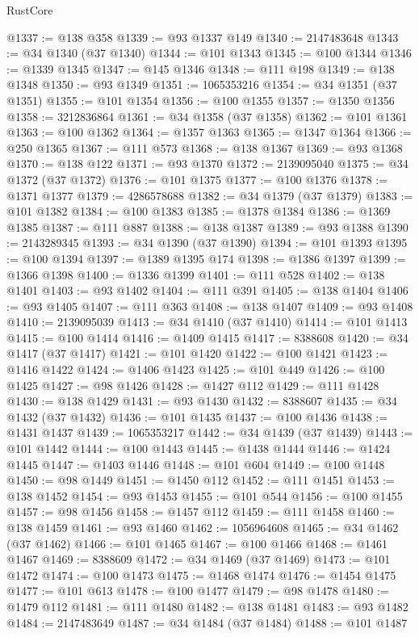\begin{lexlean}{RustCore}
\begin{coremodule}
@1337 := @138 @358
@1339 := @93 @1337 @149
@1340 := 2147483648
@1343 := @34 @1340 (@37 @1340)
@1344 := @101 @1343
@1345 := @100 @1344
@1346 := @1339 @1345
@1347 := @145 @1346
@1348 := @111 @198
@1349 := @138 @1348
@1350 := @93 @1349
@1351 := 1065353216
@1354 := @34 @1351 (@37 @1351)
@1355 := @101 @1354
@1356 := @100 @1355
@1357 := @1350 @1356
@1358 := 3212836864
@1361 := @34 @1358 (@37 @1358)
@1362 := @101 @1361
@1363 := @100 @1362
@1364 := @1357 @1363
@1365 := @1347 @1364
@1366 := @250 @1365
@1367 := @111 @573
@1368 := @138 @1367
@1369 := @93 @1368
@1370 := @138 @122
@1371 := @93 @1370
@1372 := 2139095040
@1375 := @34 @1372 (@37 @1372)
@1376 := @101 @1375
@1377 := @100 @1376
@1378 := @1371 @1377
@1379 := 4286578688
@1382 := @34 @1379 (@37 @1379)
@1383 := @101 @1382
@1384 := @100 @1383
@1385 := @1378 @1384
@1386 := @1369 @1385
@1387 := @111 @887
@1388 := @138 @1387
@1389 := @93 @1388
@1390 := 2143289345
@1393 := @34 @1390 (@37 @1390)
@1394 := @101 @1393
@1395 := @100 @1394
@1397 := @1389 @1395 @174
@1398 := @1386 @1397
@1399 := @1366 @1398
@1400 := @1336 @1399
@1401 := @111 @528
@1402 := @138 @1401
@1403 := @93 @1402
@1404 := @111 @391
@1405 := @138 @1404
@1406 := @93 @1405
@1407 := @111 @363
@1408 := @138 @1407
@1409 := @93 @1408
@1410 := 2139095039
@1413 := @34 @1410 (@37 @1410)
@1414 := @101 @1413
@1415 := @100 @1414
@1416 := @1409 @1415
@1417 := 8388608
@1420 := @34 @1417 (@37 @1417)
@1421 := @101 @1420
@1422 := @100 @1421
@1423 := @1416 @1422
@1424 := @1406 @1423
@1425 := @101 @449
@1426 := @100 @1425
@1427 := @98 @1426
@1428 := @1427 @112
@1429 := @111 @1428
@1430 := @138 @1429
@1431 := @93 @1430
@1432 := 8388607
@1435 := @34 @1432 (@37 @1432)
@1436 := @101 @1435
@1437 := @100 @1436
@1438 := @1431 @1437
@1439 := 1065353217
@1442 := @34 @1439 (@37 @1439)
@1443 := @101 @1442
@1444 := @100 @1443
@1445 := @1438 @1444
@1446 := @1424 @1445
@1447 := @1403 @1446
@1448 := @101 @604
@1449 := @100 @1448
@1450 := @98 @1449
@1451 := @1450 @112
@1452 := @111 @1451
@1453 := @138 @1452
@1454 := @93 @1453
@1455 := @101 @544
@1456 := @100 @1455
@1457 := @98 @1456
@1458 := @1457 @112
@1459 := @111 @1458
@1460 := @138 @1459
@1461 := @93 @1460
@1462 := 1056964608
@1465 := @34 @1462 (@37 @1462)
@1466 := @101 @1465
@1467 := @100 @1466
@1468 := @1461 @1467
@1469 := 8388609
@1472 := @34 @1469 (@37 @1469)
@1473 := @101 @1472
@1474 := @100 @1473
@1475 := @1468 @1474
@1476 := @1454 @1475
@1477 := @101 @613
@1478 := @100 @1477
@1479 := @98 @1478
@1480 := @1479 @112
@1481 := @111 @1480
@1482 := @138 @1481
@1483 := @93 @1482
@1484 := 2147483649
@1487 := @34 @1484 (@37 @1484)
@1488 := @101 @1487

\end{coremodule}
\end{lexlean}

